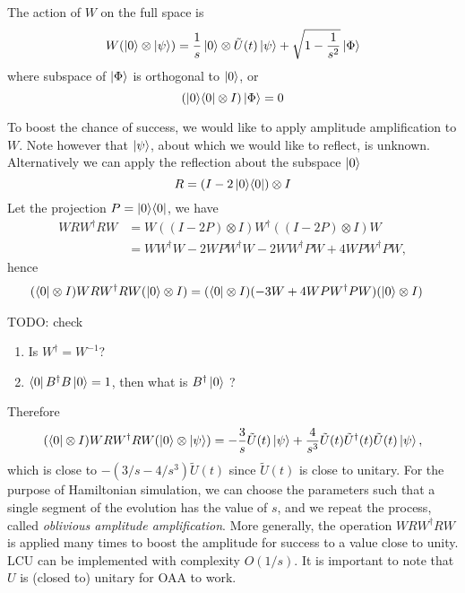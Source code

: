 \documentclass[11pt, oneside]{article}   	%
\begin{document}
The action of $W$ on the full space is
\begin{equation*} 
W (\ket{0} \otimes \ket{\psi}) = \frac{1}{s} \ket{0} \otimes \tilde{U}(t) \ket{\psi} + \sqrt{1 - \frac{1}{s^2}} \ket{\Phi}
\end{equation*}
where subspace of $\ket{\Phi}$ is orthogonal to $\ket{0}$, or
\begin{equation*}
(\ket{0} \! \bra{0} \otimes I) \ket{\Phi} = 0
\end{equation*}

To boost the chance of success, we would like to apply amplitude amplification to $W$. Note however that $\ket{\psi}$, about which we would like to reflect, is unknown.
Alternatively we can apply the reflection about the subspace $\ket{0}$
\begin{equation*} 
R = (I - 2 \ket{0} \! \bra{0}) \otimes I
\end{equation*}
Let the projection $P = \ket{0} \! \bra{0}$, we have
\begin{align*} 
W R W^{\dagger} R W 
&= W ((I - 2 P) \otimes I) W^{\dagger} ((I - 2 P) \otimes I) W \\
&= W W^{\dagger} W - 2 W P W^{\dagger} W - 2 W W^{\dagger} P W + 4 W P W^{\dagger} P W,
\end{align*}
hence 
\begin{align*} 
(\bra{0} \otimes I) W R W^{\dagger} R W (\ket{0} \otimes I) 
&= (\bra{0} \otimes I) (-3W + 4 W P W^{\dagger} P W) (\ket{0} \otimes I) 
\end{align*}

TODO: check
\begin{enumerate}
\item
Is $W^{\dagger} = W^{-1}$?
\item
$\bra{0} B^{\dagger} B \ket{0} = 1$, then what is $B^{\dagger} \ket{0}$ ?
\end{enumerate}

Therefore
\begin{equation*} 
(\bra{0} \otimes I) W R W^{\dagger} R W (\ket{0} \otimes \ket{\psi}) 
= - \frac{3}{s} \tilde{U}(t) \ket{\psi} + \frac{4}{s^3} \tilde{U}(t) \tilde{U}^{\dagger}(t) \tilde{U}(t) \ket{\psi}, 
\end{equation*}
which is close to $-(3/s - 4/s^3) \tilde{U}(t)$ since $\tilde{U}(t)$ is close to unitary.
For the purpose of Hamiltonian simulation, we can choose the parameters such that a single segment of the evolution has the value of $s$, and we repeat the process, called \textit{oblivious amplitude amplification}. 
More generally, the operation $W R W^{\dagger} R W$ is applied many times to boost the amplitude for success to a value close to unity. 
LCU can be implemented with complexity $O(1/s)$.
It is important to note that $U$ is (closed to) unitary for OAA to work.
\end{document}

